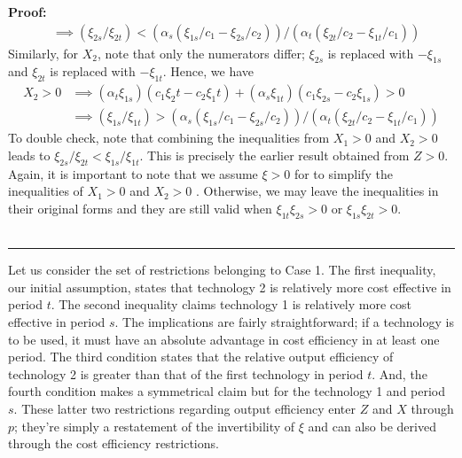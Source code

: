 \documentclass[11pt,a4paper,leqno]{extarticle}
\newenvironment{proof}[1][Proof]{\noindent\textbf{#1:} }{\ \rule{0.5em}{0.5em}}
\begin{document}
\begin{proof}
\begin{align*}
		&\implies (\xi_{2s}/\xi_{2t}) < (\alpha_s (\xi_{1s}/c_1 -  \xi_{2s}/c_2))/(\alpha_t(\xi_{2t}/c_2 - \xi_{1t}/c_1)) 
		\end{align*}
		Similarly, for $X_2$, note that only the numerators differ; $\xi_{2s}$ is replaced with $-\xi_{1s}$ and $\xi_{2t}$ is replaced with $-\xi_{1t}$. Hence, we have
		\begin{align*}
		X_2 > 0 &\implies (\alpha_t \xi_{1s})(c_1 \xi_2t - c_2\xi_1t) + (\alpha_s \xi_{1t})(c_1 \xi_{2s} - c_2 \xi_{1s}) > 0\\
		&\implies (\xi_{1s}/\xi_{1t}) > (\alpha_s (\xi_{1s}/c_1 -  \xi_{2s}/c_2))/(\alpha_t(\xi_{2t}/c_2 - \xi_{1t}/c_1)) 
		\end{align*}
		To double check, note that combining the inequalities from $X_1>0$ and $X_2 > 0$ leads to $\xi_{2s}/\xi_{2t} < \xi_{1s}/\xi_{1t}$. This is precisely the earlier result obtained from $Z > 0$. Again, it is  important to note that we assume $\xi > 0$ for to simplify the inequalities of $X_1 > 0$ and $X_2 > 0$ . Otherwise, we may leave the inequalities in their original forms and they are still valid when  $\xi_{1t} \xi_{2s} > 0$ or $\xi_{1s} \xi_{2t} > 0$.   \\ \hfill
	\end{proof}
	
	Let us consider the set of restrictions belonging to Case 1. The first inequality, our initial assumption, states that technology 2 is relatively more cost effective in period $t$. The second inequality claims technology 1 is relatively more cost effective in period $s$. The implications are fairly straightforward; if a technology is to be used, it must have an absolute advantage in cost efficiency in at least one period. The third condition states that the relative output efficiency of technology 2 is greater than that of the first technology in period $t$. And, the fourth condition makes a symmetrical claim but for the technology 1 and period $s$. These latter two restrictions regarding output efficiency enter $Z$ and $X$ through $p$; they're simply a restatement of the invertibility of $\xi$ and can also be derived through the cost efficiency restrictions. 
	
\end{document}
